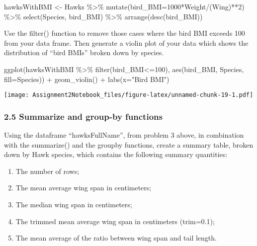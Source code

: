 \documentclass[
]{article}
\newenvironment{Shaded}{\begin{snugshade}}{\end{snugshade}}
\newcommand{\AttributeTok}[1]{\textcolor[rgb]{0.77,0.63,0.00}{#1}}
\newcommand{\DecValTok}[1]{\textcolor[rgb]{0.00,0.00,0.81}{#1}}
\newcommand{\FunctionTok}[1]{\textcolor[rgb]{0.00,0.00,0.00}{#1}}
\newcommand{\NormalTok}[1]{#1}
\newcommand{\OtherTok}[1]{\textcolor[rgb]{0.56,0.35,0.01}{#1}}
\newcommand{\SpecialCharTok}[1]{\textcolor[rgb]{0.00,0.00,0.00}{#1}}
\newcommand{\StringTok}[1]{\textcolor[rgb]{0.31,0.60,0.02}{#1}}
\providecommand{\tightlist}{%
  \setlength{\itemsep}{0pt}\setlength{\parskip}{0pt}}
\begin{document}
\begin{Shaded}
\begin{Highlighting}[]
\NormalTok{hawksWithBMI }\OtherTok{\textless{}{-}}\NormalTok{ Hawks }\SpecialCharTok{\%\textgreater{}\%} \FunctionTok{mutate}\NormalTok{(}\AttributeTok{bird\_BMI=}\DecValTok{1000}\SpecialCharTok{*}\NormalTok{Weight}\SpecialCharTok{/}\NormalTok{(Wing)}\SpecialCharTok{**}\DecValTok{2}\NormalTok{) }\SpecialCharTok{\%\textgreater{}\%} \FunctionTok{select}\NormalTok{(Species, bird\_BMI) }\SpecialCharTok{\%\textgreater{}\%} \FunctionTok{arrange}\NormalTok{(}\FunctionTok{desc}\NormalTok{(bird\_BMI))}
\end{Highlighting}
\end{Shaded}

Use the filter() function to remove those cases where the bird BMI
exceeds 100 from your data frame. Then generate a violin plot of your
data which shows the distribution of ``bird BMIs'' broken down by
species.

\begin{Shaded}
\begin{Highlighting}[]
\FunctionTok{ggplot}\NormalTok{(hawksWithBMI }\SpecialCharTok{\%\textgreater{}\%} \FunctionTok{filter}\NormalTok{(bird\_BMI}\SpecialCharTok{\textless{}=}\DecValTok{100}\NormalTok{), }\FunctionTok{aes}\NormalTok{(bird\_BMI, Species, }\AttributeTok{fill=}\NormalTok{Species)) }\SpecialCharTok{+} \FunctionTok{geom\_violin}\NormalTok{() }\SpecialCharTok{+} \FunctionTok{labs}\NormalTok{(}\AttributeTok{x=}\StringTok{"Bird BMI"}\NormalTok{)}
\end{Highlighting}
\end{Shaded}

\texttt{[image: Assignment2Notebook\_files/figure-latex/unnamed-chunk-19-1.pdf]}

\hypertarget{summarize-and-group-by-functions}{%
\subsubsection{2.5 Summarize and group-by
functions}\label{summarize-and-group-by-functions}}

Using the dataframe ``hawksFullName'', from problem 3 above, in
combination with the summarize() and the groupby functions, create a
summary table, broken down by Hawk species, which contains the following
summary quantities:

\begin{enumerate}
\def\labelenumi{\arabic{enumi}.}
\tightlist
\item
  The number of rows;
\item
  The mean average wing span in centimeters;
\item
  The median wing span in centimeters;
\item
  The trimmed mean average wing span in centimeters (trim=0.1);\\
\item
  The mean average of the ratio between wing span and tail length.
\end{enumerate}
\end{document}
